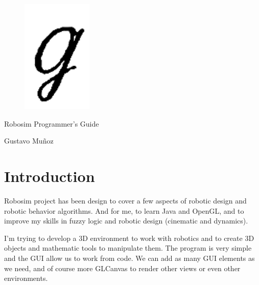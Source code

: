 \documentclass[12pt,a4paper,oneside,english]{book}
\begin{document}
\frontmatter


\begin{titlepage}

  \begin{figure}[h]  %
    \begin{center}
      \includegraphics[width=0.30\textwidth]{images/Logo.png}
    \end{center}
  \end{figure}

  \vspace{5mm}
  \begin{center}
    \Huge
    Robosim Programmer's Guide
  \end{center}

  \vspace{20mm}
  \begin{center}
    Gustavo Mu\~{n}oz
  \end{center}

\end{titlepage}

\tableofcontents
\listoffigures
\listoftables


\chapter{Introduction}

Robosim project has been design to cover a few aspects of robotic design and robotic behavior algorithms. And for me, to learn Java and OpenGL, and to improve my skills in fuzzy logic and robotic design (cinematic and dynamics).

I'm trying to develop a 3D environment to work with robotics and to create 3D objects and mathematic tools to manipulate them. The program is very simple and the GUI allow us to work from code. We can add as many GUI elements as we need, and of course more GLCanvas to render other views or even other environments.
\end{document}
